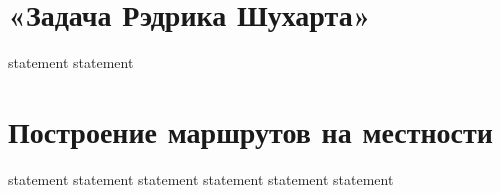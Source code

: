 \section{«Задача Рэдрика Шухарта»}

{statement}
{statement}

\section{Построение маршрутов на местности}

{statement}
{statement}
{statement}
{statement}
{statement}
{statement}